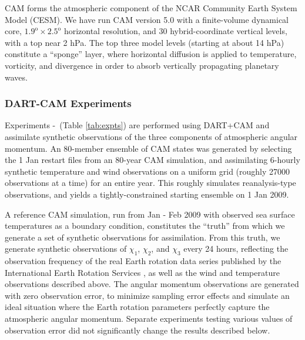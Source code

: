 CAM \citep{nealeetal2010} forms the atmospheric component of the NCAR Community Earth System Model (CESM). 
We have run CAM version 5.0 with a finite-volume dynamical core, $1.9^{\text{o}} \times 2.5^{\text{o}}$ horizontal resolution, and  30 hybrid-coordinate vertical levels, with a top near 2 hPa.
The top three model levels (starting at about 14 hPa) constitute a ``sponge'' layer, where horizontal diffusion is applied to temperature, vorticity, and divergence in order to absorb vertically propagating planetary waves.  


\subsubsection{DART-CAM Experiments}
Experiments \NODA-\ERPRST ~(Table \ref{tab:expts}) are performed using DART+CAM and assimilate synthetic observations of the three components of atmospheric angular momentum.  
An 80-member ensemble of CAM states was generated by selecting the 1 Jan restart files from an 80-year CAM simulation, and assimilating 6-hourly synthetic temperature and wind observations on a uniform grid (roughly 27000 observations at a time) for an entire year. 
This roughly simulates reanalysis-type observations, and yields a tightly-constrained starting ensemble on 1 Jan 2009.  

A reference CAM simulation, run from Jan - Feb 2009 with observed sea surface temperatures as a boundary condition, constitutes the ``truth'' from which we generate a set of synthetic observations for assimilation. 
From this truth, we generate synthetic observations of $\chi_1$, $\chi_2$, and $\chi_3$ every 24 hours, reflecting the observation frequency of the real Earth rotation data series published by the International Earth Rotation Services \citep{iers}, as well as the wind and temperature observations described above. 
The angular momentum observations are generated with zero observation error, to minimize sampling error effects and simulate an ideal situation where the Earth rotation parameters perfectly capture the atmospheric angular momentum. 
Separate experiments testing various values of observation error did not significantly change the results described below.  


